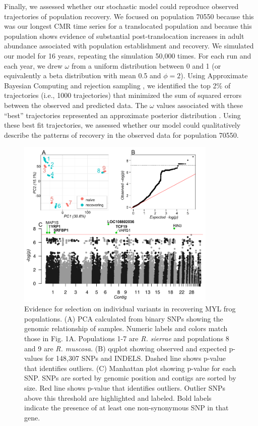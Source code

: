 \documentclass[9pt,twoside,lineno]{pnas-new}
\begin{document}
Finally, we assessed whether our stochastic model could reproduce
observed trajectories of population recovery. We focused on population
70550 because this was our longest CMR time series for a translocated
population and because this population shows evidence of substantial
post-translocation increases in adult abundance associated with
population establishment and recovery. We simulated our model for 16
years, repeating the simulation 50,000 times. For each run and each
year, we drew \(\omega\) from a uniform distribution between 0 and 1 (or
equivalently a beta distribution with mean 0.5 and \(\phi = 2\)). Using
Approximate Bayesian Computing and rejection sampling
\citep{kosmala2016}, we identified the top 2\% of trajectories (i.e.,
1000 trajectories) that minimized the sum of squared errors between the
observed and predicted data. The \(\omega\) values associated with these
``best'' trajectories represented an approximate posterior distribution
\citep{beaumont2010}. Using these best fit trajectories, we assessed
whether our model could qualitatively describe the patterns of recovery
in the observed data for population 70550.

\newpage

\begin{figure}

{\centering \includegraphics[width=0.85\textwidth]{figures/pca_qq_manhattan.png}

}

\caption{\label{fig-selectionresults}Evidence for selection on
individual variants in recovering MYL frog populations. (A) PCA
calculated from binary SNPs showing the genomic relationship of samples.
Numeric labels and colors match those in
Fig. 1A. Populations 1-7 are \emph{R.
sierrae} and populations 8 and 9 are \emph{R. muscosa}. (B) qqplot
showing observed and expected p-values for 148,307 SNPs and INDELS.
Dashed line shows p-value that identifies outliers. (C) Manhattan plot
showing p-value for each SNP. SNPs are sorted by genomic position and
contigs are sorted by size. Red line shows p-value that identifies
outliers. Outlier SNPs above this threshold are highlighted and labeled.
Bold labels indicate the presence of at least one non-synonymous SNP in
that gene.}

\end{figure}\clearpage
\end{document}
